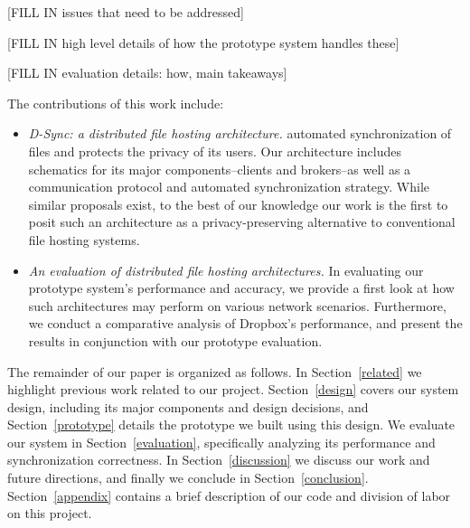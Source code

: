 [FILL IN issues that need to be addressed]


[FILL IN high level details of how the prototype system handles these]

[FILL IN evaluation details: how, main takeaways]

The contributions of this work include:
\begin{itemize}
\item \emph{D-Sync: a distributed file hosting architecture.} 
automated synchronization of files and protects the privacy of its users.
Our architecture includes schematics for its major components--clients and brokers--as well as a communication protocol and automated synchronization strategy.
While similar proposals exist, to the best of our knowledge 
our work is the first to posit such an architecture as a privacy-preserving alternative to conventional file hosting systems.
\item \emph{An evaluation of distributed file hosting architectures.}
In evaluating our prototype system's performance and accuracy,
we provide a first look at how such architectures may perform
on various network scenarios.
Furthermore, we conduct a comparative analysis of Dropbox's
performance, and present the results in conjunction with our prototype evaluation.
\end{itemize}

The remainder of our paper is organized as follows.
In Section~\ref{related} we highlight previous work related to our project.
Section~\ref{design} covers our system design, including
its major components and design decisions,
and Section~\ref{prototype} details the prototype we built using this design.
We evaluate our system in Section~\ref{evaluation}, specifically
analyzing its performance and synchronization correctness.
In Section~\ref{discussion} we discuss our work and future directions,
and finally we conclude in Section~\ref{conclusion}.
Section~\ref{appendix} contains a brief description
of our code and division of labor on this project.
